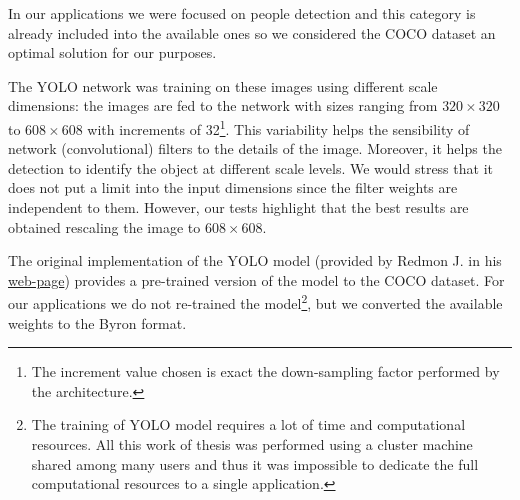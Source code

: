 \documentclass{standalone}
\begin{document}
In our applications we were focused on people detection and this category is already included into the available ones so we considered the COCO dataset an optimal solution for our purposes.

The YOLO network was training on these images using different scale dimensions: the images are fed to the network with sizes ranging from $320\times320$ to $608\times608$ with increments of 32\footnote{
  The increment value chosen is exact the down-sampling factor performed by the architecture.
}.
This variability helps the sensibility of network (convolutional) filters to the details of the image.
Moreover, it helps the detection to identify the object at different scale levels.
We would stress that it does not put a limit into the input dimensions since the filter weights are independent to them.
However, our tests highlight that the best results are obtained rescaling the image to $608\times608$.

The original implementation of the YOLO model (provided by Redmon J. in his \href{https://pjreddie.com/darknet/yolo}{web-page}) provides a pre-trained version of the model to the COCO dataset.
For our applications we do not re-trained the model\footnote{
  The training of YOLO model requires a lot of time and computational resources.
  All this work of thesis was performed using a cluster machine shared among many users and thus it was impossible to dedicate the full computational resources to a single application.
}, but we converted the available weights to the Byron format.
\end{document}
